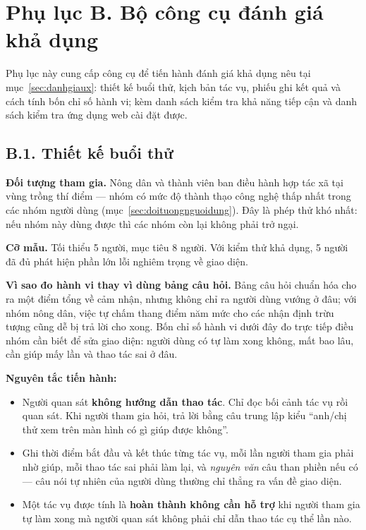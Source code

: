 
\section*{Phụ lục B. Bộ công cụ đánh giá khả dụng}
\label{apdx:khaosat}

Phụ lục này cung cấp công cụ để tiến hành đánh giá khả dụng nêu tại
mục~\ref{sec:danhgiaux}: thiết kế buổi thử, kịch bản tác vụ, phiếu ghi kết quả
và cách tính bốn chỉ số hành vi; kèm danh sách kiểm tra khả năng tiếp cận và
danh sách kiểm tra ứng dụng web cài đặt được.

\subsection*{B.1. Thiết kế buổi thử}

\noindent\textbf{Đối tượng tham gia.} Nông dân và thành viên ban điều hành hợp
tác xã tại vùng trồng thí điểm --- nhóm có mức độ thành thạo công nghệ thấp
nhất trong các nhóm người dùng (mục~\ref{sec:doituongnguoidung}). Đây là phép
thử khó nhất: nếu nhóm này dùng được thì các nhóm còn lại không phải trở ngại.

\noindent\textbf{Cỡ mẫu.} Tối thiểu 5 người, mục tiêu 8 người. Với kiểm thử khả
dụng, 5 người đã đủ phát hiện phần lớn lỗi nghiêm trọng về giao diện.

\noindent\textbf{Vì sao đo hành vi thay vì dùng bảng câu hỏi.} Bảng câu hỏi
chuẩn hóa cho ra một điểm tổng về cảm nhận, nhưng không chỉ ra người dùng vướng
ở đâu; với nhóm nông dân, việc tự chấm thang điểm năm mức cho các nhận định
trừu tượng cũng dễ bị trả lời cho xong. Bốn chỉ số hành vi dưới đây đo trực
tiếp điều nhóm cần biết để sửa giao diện: người dùng có tự làm xong không, mất
bao lâu, cần giúp mấy lần và thao tác sai ở đâu.

\noindent\textbf{Nguyên tắc tiến hành:}
\begin{itemize}
    \item Người quan sát \textbf{không hướng dẫn thao tác}. Chỉ đọc bối cảnh tác
    vụ rồi quan sát. Khi người tham gia hỏi, trả lời bằng câu trung lập kiểu
    ``anh/chị thử xem trên màn hình có gì giúp được không''.
    \item Ghi thời điểm bắt đầu và kết thúc từng tác vụ, mỗi lần người tham gia
    phải nhờ giúp, mỗi thao tác sai phải làm lại, và \emph{nguyên văn} câu than
    phiền nếu có --- câu nói tự nhiên của người dùng thường chỉ thẳng ra vấn đề
    giao diện.
    \item Một tác vụ được tính là \textbf{hoàn thành không cần hỗ trợ} khi người
    tham gia tự làm xong mà người quan sát không phải chỉ dẫn thao tác cụ thể
    lần nào.
\end{itemize}

